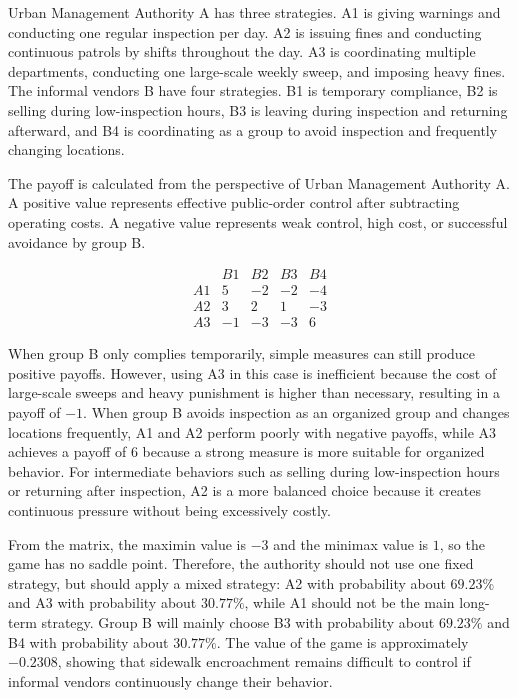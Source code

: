 \documentclass[12pt,a4paper]{article}
\begin{document}
Urban Management Authority A has three strategies. A1 is giving warnings and conducting one regular inspection per day. A2 is issuing fines and conducting continuous patrols by shifts throughout the day. A3 is coordinating multiple departments, conducting one large-scale weekly sweep, and imposing heavy fines. The informal vendors B have four strategies. B1 is temporary compliance, B2 is selling during low-inspection hours, B3 is leaving during inspection and returning afterward, and B4 is coordinating as a group to avoid inspection and frequently changing locations.

The payoff is calculated from the perspective of Urban Management Authority A. A positive value represents effective public-order control after subtracting operating costs. A negative value represents weak control, high cost, or successful avoidance by group B.

\begingroup
\small
\renewcommand{\arraystretch}{0.75}
\setlength{\arraycolsep}{4pt}
\[
\begin{array}{c|cccc}
 & B1 & B2 & B3 & B4 \\
\hline
A1 & 5 & -2 & -2 & -4 \\
A2 & 3 & 2 & 1 & -3 \\
A3 & -1 & -3 & -3 & 6
\end{array}
\]
\endgroup

When group B only complies temporarily, simple measures can still produce positive payoffs. However, using A3 in this case is inefficient because the cost of large-scale sweeps and heavy punishment is higher than necessary, resulting in a payoff of $-1$. When group B avoids inspection as an organized group and changes locations frequently, A1 and A2 perform poorly with negative payoffs, while A3 achieves a payoff of $6$ because a strong measure is more suitable for organized behavior. For intermediate behaviors such as selling during low-inspection hours or returning after inspection, A2 is a more balanced choice because it creates continuous pressure without being excessively costly.

From the matrix, the maximin value is $-3$ and the minimax value is $1$, so the game has no saddle point. Therefore, the authority should not use one fixed strategy, but should apply a mixed strategy: A2 with probability about $69.23\%$ and A3 with probability about $30.77\%$, while A1 should not be the main long-term strategy. Group B will mainly choose B3 with probability about $69.23\%$ and B4 with probability about $30.77\%$. The value of the game is approximately $-0.2308$, showing that sidewalk encroachment remains difficult to control if informal vendors continuously change their behavior.
\end{document}

